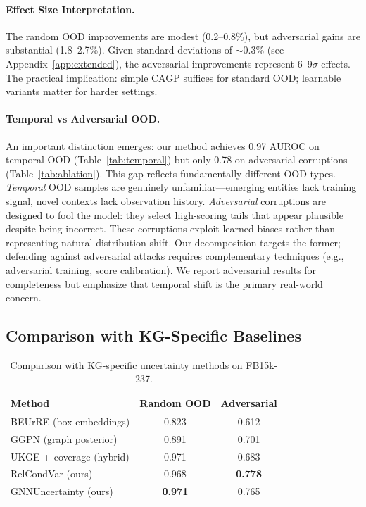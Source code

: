 \paragraph{Effect Size Interpretation.}
The random OOD improvements are modest (0.2--0.8\%), but adversarial gains are substantial (1.8--2.7\%).
Given standard deviations of $\sim$0.3\% (see Appendix~\ref{app:extended}), the adversarial improvements represent 6--9$\sigma$ effects.
The practical implication: simple CAGP suffices for standard OOD; learnable variants matter for harder settings.

\paragraph{Temporal vs Adversarial OOD.}
An important distinction emerges: our method achieves 0.97 AUROC on temporal OOD (Table~\ref{tab:temporal}) but only 0.78 on adversarial corruptions (Table~\ref{tab:ablation}).
This gap reflects fundamentally different OOD types.
\emph{Temporal} OOD samples are genuinely unfamiliar---emerging entities lack training signal, novel contexts lack observation history.
\emph{Adversarial} corruptions are designed to fool the model: they select high-scoring tails that appear plausible despite being incorrect.
These corruptions exploit learned biases rather than representing natural distribution shift.
Our decomposition targets the former; defending against adversarial attacks requires complementary techniques (e.g., adversarial training, score calibration).
We report adversarial results for completeness but emphasize that temporal shift is the primary real-world concern.

\subsection{Comparison with KG-Specific Baselines}

\begin{table}[t]
\centering
\caption{Comparison with KG-specific uncertainty methods on FB15k-237.}
\label{tab:baselines}
\vspace{0.5em}
\small
\begin{tabular}{lcc}
\toprule
Method & Random OOD & Adversarial \\
\midrule
BEUrRE (box embeddings) & 0.823 & 0.612 \\
GGPN (graph posterior) & 0.891 & 0.701 \\
UKGE + coverage (hybrid) & 0.971 & 0.683 \\
\midrule
RelCondVar (ours) & 0.968 & \textbf{0.778} \\
GNNUncertainty (ours) & \textbf{0.971} & 0.765 \\
\bottomrule
\end{tabular}
\end{table}

